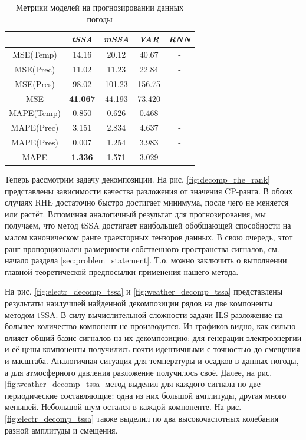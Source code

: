 			\begin{table}[h!]
				\centering
				\caption{Метрики моделей на прогнозировании данных погоды}\label{tab:pred_res_weather}
				\begin{tabular}{|c|c|c|c|c|}
					\hline
					& \textit{tSSA}                & \textit{mSSA} & \textit{VAR} & \textit{RNN} \\ \hline
					MSE(Temp)  & 14.16                        & 20.12         & 40.67        & -            \\ \hline
					MSE(Prec)  & 11.02                        & 11.23         & 22.84        & -            \\ \hline
					MSE(Pres)  & 98.02                        & 101.23        & 156.75       & -            \\ \hline
					MSE        & \textbf{41.067}              & 44.193        & 73.420       & -            \\ \hline
					MAPE(Temp) & 0.850 & 0.626         & 0.468        & -            \\ \hline
					MAPE(Prec) & 3.151 & 2.834         & 4.637        & -            \\ \hline
					MAPE(Pres) & 0.007 & 1.254         & 3.983        & -            \\ \hline
					MAPE       & \textbf{1.336}               & 1.571         & 3.029        & -            \\ \hline
				\end{tabular}
			\end{table}
			
			Теперь рассмотрим задачу декомпозиции. На рис. \ref{fig:decomp_rhe_rank} представлены зависимости качества разложения от значения CP-ранга. В обоих случаях $ \overline{\text{RHE}} $ достаточно быстро достигает минимума, после чего не меняется или растёт. Вспоминая аналогичный результат для прогнозирования, мы получаем, что метод tSSA достигает наибольшей обобщающей способности на малом каноническом ранге траекторных тензоров данных. В свою очередь, этот ранг пропорционален размерности собственного пространства сигналов, см. начало раздела \ref{sec:problem_statement}. Т.о. можно заключить о выполнении главной теоретической предпосылки применения нашего метода.
			
			На рис. \ref{fig:electr_decomp_tssa} и \ref{fig:weather_decomp_tssa} представлены результаты наилучшей найденной декомпозиции рядов на две компоненты методом tSSA. В силу вычислительной сложности задачи ILS разложение на большее количество компонент не производится. Из графиков видно, как сильно влияет общий базис сигналов на их декомпозицию: для генерации электроэнергии и её цены компоненты получились почти идентичными с точностью до смещения и масштаба. Аналогичная ситуация для температуры и осадков в данных погоды, а для атмосферного давления разложение получилось своё. Далее, на рис. \ref{fig:weather_decomp_tssa} метод выделил для каждого сигнала по две периодические составляющие: одна из них большой амплитуды, другая много меньшей. Небольшой шум остался в каждой компоненте. На рис. \ref{fig:electr_decomp_tssa} также выделил по два высокочастотных колебания разной амплитуды и смещения.
			
